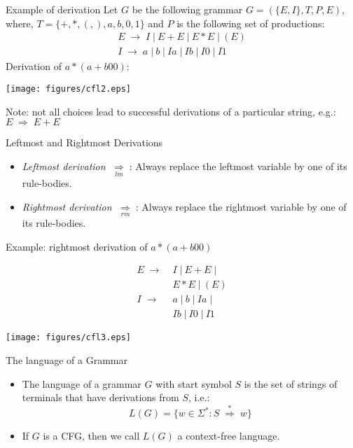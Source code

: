 \documentclass{prosper}%
\newcommand{\e} {{\mbox{$\epsilon$}}}
\newcommand{\ra}{\mbox{$\;\rightarrow\;$}}
\newcommand{\vb}{\mbox{$\;|\:$}}
\newcommand{\dra}{\mbox{$\;\Rightarrow\;$}}
\newcommand{\cdra}{\mbox{$\;\stackrel{*}{\Rightarrow}\;$}}
\newcommand{\lmd}{\mbox{$\;\underset{lm}{\Rightarrow}\;$}}
\newcommand{\rmd}{\mbox{$\;\underset{rm}{\Rightarrow}\;$}}\newcommand{\cfg}[1]{$#1 = (V, \Sigma, R, S)$}
\begin{document}
\begin{slide}{Example of derivation}
Let $G$ be the following grammar $G=(\{E, I\}, T, P, E)$, where,  $T = 
\{+, *, (, ), a, b, 0, 1\}$ and $P$ is the following set of productions:
\[
\begin{array}{l}
E \ra I \vb E+E\vb E*E\vb (E)\\
I\ra a\vb b \vb Ia \vb Ib \vb I0 \vb I1
\end{array}
\]
Derivation of $a * (a + b00)$: 
\begin{center}
\texttt{[image: figures/cfl2.eps]}
\end{center}
Note: not all choices lead to successful derivations of a particular string, e.g.: $E\dra E+E$
\end{slide}

\begin{slide}{Leftmost and Rightmost Derivations}
\begin{itemize}
\item {\em Leftmost derivation} \lmd: Always replace the leftmost variable by one of its rule-bodies. 
\item {\em Rightmost derivation} \rmd: Always replace the rightmost variable by one of its rule-bodies.
\end{itemize}
Example: rightmost derivation of $a * (a + b00)$
\begin{minipage}{5cm}
\[
\begin{array}{ll}
E \ra &I \vb E+E\vb \\& E*E\vb (E)\\
I\ra &a\vb b \vb Ia  \vb \\&Ib \vb I0 \vb I1
\end{array}
\]
\end{minipage}
\begin{minipage}{3cm}

\begin{center}
\texttt{[image: figures/cfl3.eps]}
\end{center}
\end{minipage}
\end{slide}

\begin{slide}{The language of a Grammar}
\begin{itemize}
\item The {\blue language of a grammar} $G$ with start symbol $S$ is the set of strings of terminals that have derivations from $S$, i.e.:
\[
L(G)=\{w\in\Sigma^*:S\cdra w\}
\]
\item If $G$ is a CFG, then we call $L(G)$  a {\blue context-free language}.
\end{itemize}
\end{slide}
\end{document}
